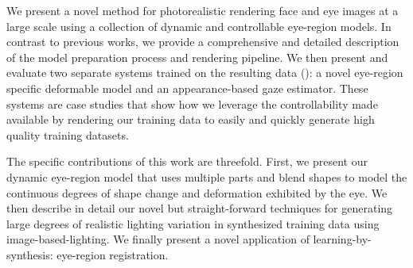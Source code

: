 

We present a novel method for photorealistic rendering face and eye images at a large scale using a collection of dynamic and controllable eye-region models.
In contrast to previous works, we provide a comprehensive and detailed description of the model preparation process and rendering pipeline.
We then present and evaluate two separate systems trained on the resulting data (\emph{\dataset}): a novel eye-region specific deformable model and an appearance-based gaze estimator.
These systems are case studies that show how we leverage the controllability made available by rendering our training data to easily and quickly generate high quality training datasets.

The specific contributions of this work are threefold.
First, we present our dynamic eye-region model that uses multiple parts and blend shapes to model the continuous degrees of shape change and deformation exhibited by the eye.
We then describe in detail our novel but straight-forward techniques for generating large degrees of realistic lighting variation in synthesized training data using image-based-lighting.
We finally present a novel application of learning-by-synthesis: eye-region registration.